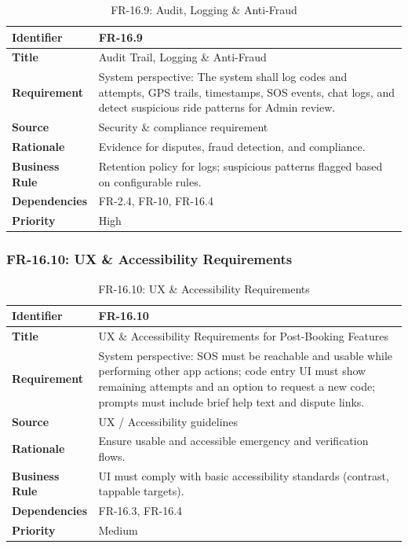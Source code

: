 \begin{longtable}{|p{3cm}|p{12cm}|}
\caption{FR-16.9: Audit, Logging \& Anti-Fraud}
\label{tab:fr-16-9} \\
\hline
\rowcolor{lightgray!30}
\textbf{Identifier} & FR-16.9 \\
\hline
\textbf{Title} & Audit Trail, Logging \& Anti-Fraud \\
\hline
\textbf{Requirement} & System perspective: The system shall log codes and attempts, GPS trails, timestamps, SOS events, chat logs, and detect suspicious ride patterns for Admin review. \\
\hline
\textbf{Source} & Security \& compliance requirement \\
\hline
\textbf{Rationale} & Evidence for disputes, fraud detection, and compliance. \\
\hline
\textbf{Business Rule} & Retention policy for logs; suspicious patterns flagged based on configurable rules. \\
\hline
\textbf{Dependencies} & FR-2.4, FR-10, FR-16.4 \\
\hline
\textbf{Priority} & High \\
\hline
\end{longtable}

\subsubsection{FR-16.10: UX \& Accessibility Requirements}

\begin{longtable}{|p{3cm}|p{12cm}|}
\caption{FR-16.10: UX \& Accessibility Requirements}
\label{tab:fr-16-10} \\
\hline
\rowcolor{lightgray!30}
\textbf{Identifier} & FR-16.10 \\
\hline
\textbf{Title} & UX \& Accessibility Requirements for Post-Booking Features \\
\hline
\textbf{Requirement} & System perspective: SOS must be reachable and usable while performing other app actions; code entry UI must show remaining attempts and an option to request a new code; prompts must include brief help text and dispute links. \\
\hline
\textbf{Source} & UX / Accessibility guidelines \\
\hline
\textbf{Rationale} & Ensure usable and accessible emergency and verification flows. \\
\hline
\textbf{Business Rule} & UI must comply with basic accessibility standards (contrast, tappable targets). \\
\hline
\textbf{Dependencies} & FR-16.3, FR-16.4 \\
\hline
\textbf{Priority} & Medium \\
\hline
\end{longtable}

